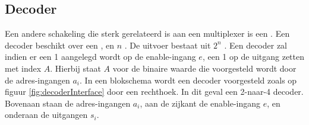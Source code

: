 \subsection{Decoder}
Een andere schakeling die sterk gerelateerd is aan een multiplexer is een . Een decoder beschikt over een , en $n$ . De uitvoer bestaat uit $2^n$ . Een decoder zal indien er een 1 aangelegd wordt op de enable-ingang $e$, een 1 op de uitgang zetten met index $A$. Hierbij staat $A$ voor de binaire waarde die voorgesteld wordt door de adres-ingangen $a_i$. In een blokschema wordt een decoder voorgesteld zoals op figuur \ref{fig:decoderInterface} door een rechthoek. In dit geval een 2-naar-4 decoder. Bovenaan staan de adres-ingangen $a_i$, aan de zijkant de enable-ingang $e$, en onderaan de uitgangen $s_i$.
